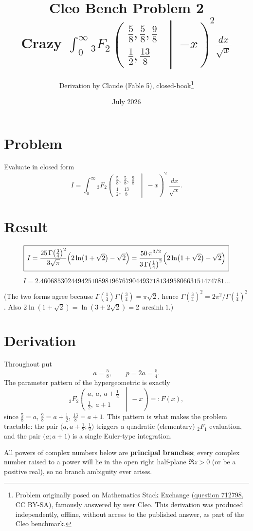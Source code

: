 \documentclass[11pt]{article}
\title{Cleo Bench Problem 2\\[1ex]\large Crazy $\displaystyle\int_0^\infty{_3F_2}\!\left(\begin{smallmatrix}\tfrac58,\tfrac58,\tfrac98\\\tfrac12,\tfrac{13}8\end{smallmatrix}\,\middle|\ {-x}\right)^{\!2}\frac{dx}{\sqrt x}$}
\author{Derivation by Claude (Fable 5), closed-book\thanks{Problem originally
posed on Mathematics Stack Exchange
(\href{https://math.stackexchange.com/q/712798}{question 712798}, CC BY-SA),
famously answered by user Cleo. This derivation was produced independently,
offline, without access to the published answer, as part of the Cleo benchmark.}}
\date{July 2026}
\theoremstyle{remark}
\begin{document}
\maketitle

\section*{Problem}

Evaluate in closed form
$$I=\int_0^\infty{}_3F_2\!\left(\begin{array}{c}\tfrac58,\ \tfrac58,\ \tfrac98\\[2pt] \tfrac12,\ \tfrac{13}8\end{array}\ \middle|\ -x\right)^{\!2}\,\frac{dx}{\sqrt x}.$$

\section*{Result}

$$\boxed{\,I=\frac{25\,\Gamma\!\left(\tfrac34\right)^2}{3\sqrt{\pi}}\Bigl(2\ln\bigl(1+\sqrt2\bigr)-\sqrt2\Bigr)
=\frac{50\,\pi^{3/2}}{3\,\Gamma\!\left(\tfrac14\right)^2}\Bigl(2\ln\bigl(1+\sqrt2\bigr)-\sqrt2\Bigr)\,}$$

$$I = 2.460685302449425108981967679044937181349580663151474781\ldots$$

(The two forms agree because $\Gamma(\tfrac14)\Gamma(\tfrac34)=\pi\sqrt2$, hence $\Gamma(\tfrac34)^2=2\pi^2/\Gamma(\tfrac14)^2$. Also $2\ln(1+\sqrt2)=\ln(3+2\sqrt2)=2\,\operatorname{arcsinh}1$.)

\section*{Derivation}

Throughout put
$$a=\tfrac58,\qquad p=2a=\tfrac54 .$$
The parameter pattern of the hypergeometric is exactly
$${}_3F_2\!\left(\begin{array}{c}a,\ a,\ a+\tfrac12\\ \tfrac12,\ a+1\end{array}\ \middle|\ -x\right)=:F(x),$$
since $\tfrac58=a$, $\tfrac98=a+\tfrac12$, $\tfrac{13}8=a+1$. This pattern is what makes the problem tractable: the pair $\bigl(a,a+\tfrac12;\tfrac12\bigr)$ triggers a quadratic (elementary) ${}_2F_1$ evaluation, and the pair $\bigl(a;a+1\bigr)$ is a single Euler-type integration.

All powers of complex numbers below are \textbf{principal branches}; every complex number raised to a power will lie in the open right half-plane $\Re z>0$ (or be a positive real), so no branch ambiguity ever arises.
\end{document}
